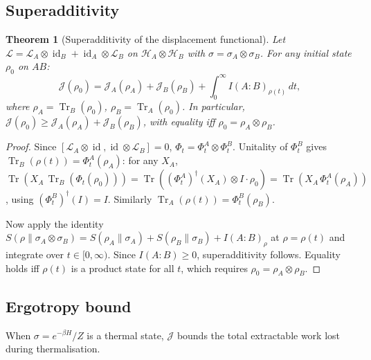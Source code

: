 \documentclass[11pt,a4paper]{article}
\newtheorem{theorem}{Theorem}[section]
\theoremstyle{definition}
\theoremstyle{remark}
\DeclareMathOperator{\Tr}{Tr}
\DeclareMathOperator{\id}{id}
\newcommand{\HH}{\mathcal{H}}
\newcommand{\LL}{\mathcal{L}}
\begin{document}
\subsection{Superadditivity}\label{ssec:superadd}

\begin{theorem}[Superadditivity of the displacement
functional]\label{thm:superadd}
Let $\LL = \LL_A \otimes \id_B + \id_A \otimes \LL_B$ on
$\HH_A \otimes \HH_B$ with $\sigma = \sigma_A \otimes \sigma_B$.
For any initial state $\rho_0$ on $AB$:
\begin{equation}\label{eq:superadd}
  \mathcal{J}(\rho_0)
  = \mathcal{J}_A(\rho_A) + \mathcal{J}_B(\rho_B)
  + \int_0^\infty I(A\!:\!B)_{\rho(t)}\,dt,
\end{equation}
where $\rho_A = \Tr_B(\rho_0)$, $\rho_B = \Tr_A(\rho_0)$.
In particular,
$\mathcal{J}(\rho_0) \ge \mathcal{J}_A(\rho_A)+\mathcal{J}_B(\rho_B)$,
with equality iff $\rho_0 = \rho_A \otimes \rho_B$.
\end{theorem}

\begin{proof}
Since $[\LL_A\otimes\id, \id\otimes\LL_B] = 0$,
$\Phi_t = \Phi_t^A \otimes \Phi_t^B$.  Unitality of $\Phi_t^B$
gives $\Tr_B(\rho(t)) = \Phi_t^A(\rho_A)$: for any $X_A$,
$\Tr(X_A\,\Tr_B(\Phi_t(\rho_0)))
= \Tr((\Phi_t^A)^\dagger(X_A)\otimes I\cdot\rho_0)
= \Tr(X_A\,\Phi_t^A(\rho_A))$,
using $(\Phi_t^B)^\dagger(I) = I$.  Similarly
$\Tr_A(\rho(t)) = \Phi_t^B(\rho_B)$.

Now apply the identity
$S(\rho\|\sigma_A\otimes\sigma_B) = S(\rho_A\|\sigma_A) +
S(\rho_B\|\sigma_B) + I(A\!:\!B)_\rho$
at $\rho = \rho(t)$ and integrate over $t \in [0,\infty)$.
Since $I(A\!:\!B) \ge 0$, superadditivity follows.  Equality holds
iff $\rho(t)$ is a product state for all $t$, which requires
$\rho_0 = \rho_A\otimes\rho_B$.
\end{proof}

\subsection{Ergotropy bound}\label{ssec:ergotropy}

When $\sigma = e^{-\beta H}/Z$ is a thermal state, $\mathcal{J}$
bounds the total extractable work lost during thermalisation.
\end{document}
